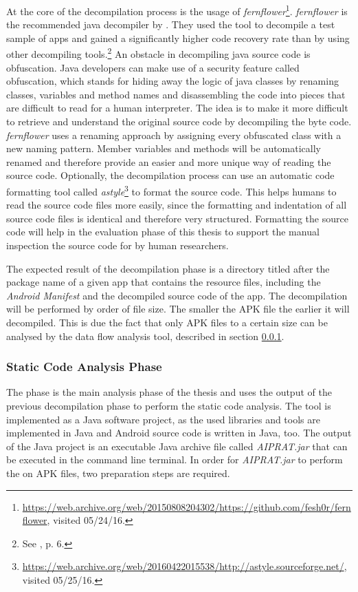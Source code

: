At the core of the decompilation process is the usage of \textit{fernflower}\footnote{\url{https://web.archive.org/web/20150808204302/https://github.com/fesh0r/fernflower}, visited 05/24/16.}.
\textit{fernflower} is the recommended java decompiler by \cite{Enck2011}. 
They used the tool to decompile a test sample of apps and gained a significantly higher code recovery rate than by using other decompiling tools.\footnote{See \cite{Enck2011}, p. 6.}
An obstacle in decompiling java source code is obfuscation. 
Java developers can make use of a security feature called obfuscation, which stands for hiding away the logic of java classes by renaming classes, variables and method names and disassembling the code into pieces that are difficult to read for a human interpreter.
The idea is to make it more difficult to retrieve and understand the original source code by decompiling the byte code.
\textit{fernflower} uses a renaming approach by assigning every obfuscated class with a new naming pattern. 
Member variables and methods will be automatically renamed and therefore provide an easier and more unique way of reading the source code.
Optionally, the decompilation process can use an automatic code formatting tool called \textit{astyle}\footnote{\url{https://web.archive.org/web/20160422015538/http://astyle.sourceforge.net/}, visited 05/25/16.} to format the source code.
This helps humans to read the source code files more easily, since the formatting and indentation of all source code files is identical and therefore very structured.
Formatting the source code will help in the evaluation phase of this thesis to support the manual inspection the source code for \ipr by human researchers.

The expected result of the decompilation phase is a directory titled after the package name of a given app that contains the resource files, including the \textit{Android Manifest} and the decompiled source code of the app.
The decompilation will be performed by order of file size.
The smaller the APK file the earlier it will decompiled.
This is due the fact that only APK files to a certain size can be analysed by the data flow analysis tool, described in section \ref{sssec:SCAP}.

\subsubsection{Static Code Analysis Phase} \label{sssec:SCAP}

The \sca phase is the main analysis phase of the thesis and uses the output of the previous decompilation phase to perform the static code analysis.
The \sca tool is implemented as a Java software project, as the used libraries  and tools are implemented in Java and Android source code is written in Java, too.
The output of the \sca Java project is an executable Java archive file called \textit{AIPRAT.jar} that can be executed in the command line terminal.
In order for \textit{AIPRAT.jar} to perform the \sca on APK files, two preparation steps are required.

